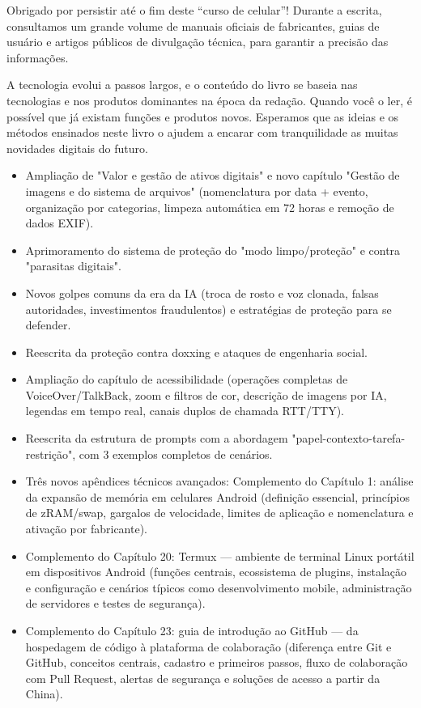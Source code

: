 
Obrigado por persistir até o fim deste “curso de celular”! Durante a escrita, consultamos um grande volume de manuais oficiais de fabricantes, guias de usuário e artigos públicos de divulgação técnica, para garantir a precisão das informações.

A tecnologia evolui a passos largos, e o conteúdo do livro se baseia nas tecnologias e nos produtos dominantes na época da redação. Quando você o ler, é possível que já existam funções e produtos novos. Esperamos que as ideias e os métodos ensinados neste livro o ajudem a encarar com tranquilidade as muitas novidades digitais do futuro.


\begin{itemize}
  \item Ampliação de "Valor e gestão de ativos digitais" e novo capítulo "Gestão de imagens e do sistema de arquivos" (nomenclatura por data + evento, organização por categorias, limpeza automática em 72 horas e remoção de dados EXIF).
  \item Aprimoramento do sistema de proteção do "modo limpo/proteção" e contra "parasitas digitais".
  \item Novos golpes comuns da era da IA (troca de rosto e voz clonada, falsas autoridades, investimentos fraudulentos) e estratégias de proteção para se defender.
  \item Reescrita da proteção contra doxxing e ataques de engenharia social.
  \item Ampliação do capítulo de acessibilidade (operações completas de VoiceOver/TalkBack, zoom e filtros de cor, descrição de imagens por IA, legendas em tempo real, canais duplos de chamada RTT/TTY).
  \item Reescrita da estrutura de prompts com a abordagem "papel-contexto-tarefa-restrição", com 3 exemplos completos de cenários.
  \item Três novos apêndices técnicos avançados: Complemento do Capítulo 1: análise da expansão de memória em celulares Android (definição essencial, princípios de zRAM/swap, gargalos de velocidade, limites de aplicação e nomenclatura e ativação por fabricante).
  \item Complemento do Capítulo 20: Termux — ambiente de terminal Linux portátil em dispositivos Android (funções centrais, ecossistema de plugins, instalação e configuração e cenários típicos como desenvolvimento mobile, administração de servidores e testes de segurança).
  \item Complemento do Capítulo 23: guia de introdução ao GitHub — da hospedagem de código à plataforma de colaboração (diferença entre Git e GitHub, conceitos centrais, cadastro e primeiros passos, fluxo de colaboração com Pull Request, alertas de segurança e soluções de acesso a partir da China).
\end{itemize}

